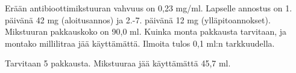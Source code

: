\begin{tehtavasivu}
\begin{tehtava}
Erään antibioottimikstuuran vahvuus on 0,23 mg/ml. Lapselle annostus on 1. päivänä 42 mg (aloitusannos) 
ja 2.-7. päivänä 12 mg (ylläpitoannokset). Mikstuuran pakkauskoko on 90,0 ml. Kuinka monta pakkausta tarvitaan, 
ja montako millilitraa jää käyttämättä. Ilmoita tulos 0,1 ml:n tarkkuudella.
 \begin{vastaus}
 Tarvitaan 5 pakkausta. Mikstuuraa jää käyttämättä 45,7 ml.
 \end{vastaus}
\end{tehtava}

\end{tehtavasivu}
